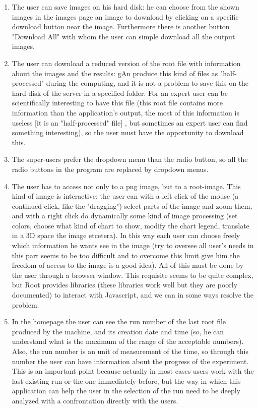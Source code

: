 \begin{enumerate}
\item The user can save images on his hard disk: he can choose from the shown images in the images page an image to download by clicking on a specific download button near the image. Furthermore there is another button "Download All" with whom the user can simple download all the output images.

\item The user can download a reduced version of the root file with information about the images and the results: gAn produce this kind of files as "half-processed" during the computing, and it is not a problem to save this on the hard disk of the server in a specified folder. For an expert user can be scientifically interesting to have this file (this root file contains more information than the application's output, the most of this information is useless [it is an "half-processed" file] , but sometimes an expert user can find something interesting), so the user must have the opportunity to download this.     

\item The super-users prefer the dropdown menu than the radio button, so all the radio buttons in the program are replaced by dropdown menus.

\item The user has to access not only to a png image, but to a root-image. This kind of image is interactive: the user can with a left click of the mouse (a continued click, like the "dragging") select parts of the image and zoom them, and with a right click do dynamically some kind of image processing (set colors, choose what kind of chart to show, modify the chart legend, translate in a 3D space the image etcetera). In this way each user can choose freely which information he wants see in the image (try to oversee all user's needs in this part seems to be too difficult and to overcome this limit give him the freedom of access to the image is a good idea).
All of this must be done by the user through a browser window. This requisite seems to be quite complex, but Root provides libraries (these libraries work well but they are poorly documented) to interact with Javascript, and we can in some ways resolve the problem.  

\item In the homepage the user can see the run number of the last root file produced by the machine, and its creation date and time (so, he can understand what is the maximum of the range of the acceptable numbers). Also, the run number is an unit of measurement of the time, so through this number the user can have information about the progress of the experiment. This is an important point because actually in most cases users work with the last existing run or the one immediately before, but the way in which this application can help the user in the selection of the run need to be deeply analyzed with a confrontation directly with the users. 


\end{enumerate}

